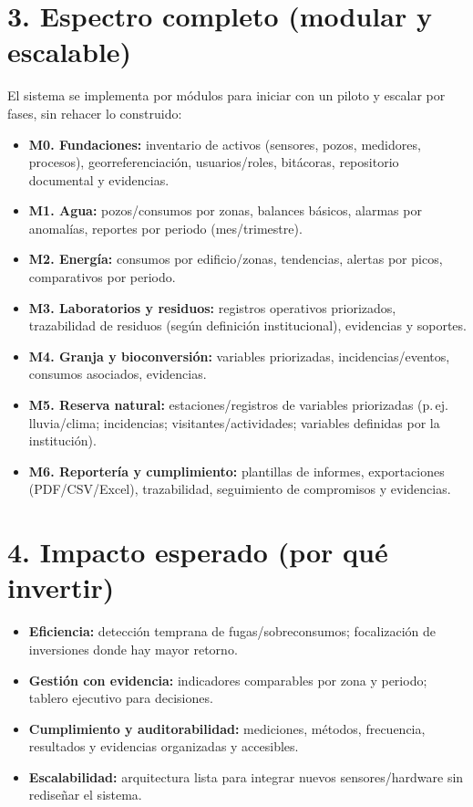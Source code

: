 \documentclass[11pt]{article}
\begin{document}
\section*{3. Espectro completo (modular y escalable)}
El sistema se implementa por módulos para iniciar con un piloto y escalar por fases, sin rehacer lo construido:
\begin{itemize}
  \item \textbf{M0. Fundaciones:} inventario de activos (sensores, pozos, medidores, procesos), georreferenciación, usuarios/roles, bitácoras, repositorio documental y evidencias.
  \item \textbf{M1. Agua:} pozos/consumos por zonas, balances básicos, alarmas por anomalías, reportes por periodo (mes/trimestre).
  \item \textbf{M2. Energía:} consumos por edificio/zonas, tendencias, alertas por picos, comparativos por periodo.
  \item \textbf{M3. Laboratorios y residuos:} registros operativos priorizados, trazabilidad de residuos (según definición institucional), evidencias y soportes.
  \item \textbf{M4. Granja y bioconversión:} variables priorizadas, incidencias/eventos, consumos asociados, evidencias.
  \item \textbf{M5. Reserva natural:} estaciones/registros de variables priorizadas (p.\,ej. lluvia/clima; incidencias; visitantes/actividades; variables definidas por la institución).
  \item \textbf{M6. Reportería y cumplimiento:} plantillas de informes, exportaciones (PDF/CSV/Excel), trazabilidad, seguimiento de compromisos y evidencias.
\end{itemize}

\section*{4. Impacto esperado (por qué invertir)}
\begin{itemize}
  \item \textbf{Eficiencia:} detección temprana de fugas/sobreconsumos; focalización de inversiones donde hay mayor retorno.
  \item \textbf{Gestión con evidencia:} indicadores comparables por zona y periodo; tablero ejecutivo para decisiones.
  \item \textbf{Cumplimiento y auditorabilidad:} mediciones, métodos, frecuencia, resultados y evidencias organizadas y accesibles.
  \item \textbf{Escalabilidad:} arquitectura lista para integrar nuevos sensores/hardware sin rediseñar el sistema.
\end{itemize}
\end{document}
